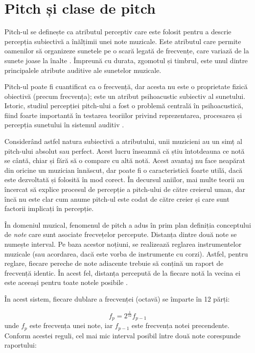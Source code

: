 \documentclass[a4paper,12pt]{report}
\begin{document}
\section{Pitch și clase de pitch}

Pitch-ul se definește ca atributul perceptiv care este folosit  
pentru a descrie percepția subiectivă a înălțimii unei note muzicale. 
Este atributul care permite oamenilor să organizeze sunetele pe o scară 
legată de frecvențe, care variază de la sunete joase la înalte \cite{Bonvini-Recognition}.
Împreună cu durata, zgomotul și timbrul, este unul dintre principalele 
atribute auditive ale sunetelor muzicale.

Pitch-ul poate fi cuantificat ca o frecvență, dar acesta nu este o 
proprietate fizică obiectivă (precum frecvența); este un atribut 
psihoacustic subiectiv al sunetului. Istoric, studiul percepției 
pitch-ului a fost o problemă centrală în psihoacustică, fiind 
foarte importantă în testarea teoriilor privind reprezentarea,  
procesarea și percepția sunetului în sistemul auditiv \cite{Signals-Sound-and-Sensation}.

Considerând astfel natura subiectivă a atributului, unii muzicieni au 
un simț al pitch-ului absolut sau perfect. Acest lucru înseamnă că 
știu întotdeauna ce notă se cântă, chiar și fără să o compare 
cu altă notă. Acest avantaj nu face neapărat din oricine un muzician 
înnăscut, dar poate fi o caracteristică foarte utilă, dacă este dezvoltată și 
folosită în mod corect.
În decursul aniilor, mai multe teorii au încercat să explice 
procesul de percepție a pitch-ului de către creierul uman, dar încă 
nu este clar cum anume pitch-ul este codat de către creier și care sunt 
factorii implicați în percepție.

În domeniul muzical, fenomenul de pitch a adus în prim plan definiția 
conceptului de \emph{note} care sunt asociate frecvețelor percepute.
Distanța dintre două note se numește interval. Pe baza 
acestor noțiuni, se realizează reglarea instrumentelor 
muzicale (sau acordarea, dacă este vorba de instrumente cu corzi).
Astfel, pentru reglare, fiecare pereche de note adiacente trebuie 
să conțină un raport de frecvență identic. În acest fel, distanța 
percepută de la fiecare notă la vecina ei este aceeași pentru toate 
notele posibile \cite{Bonvini-Recognition}. \newpage

În acest sistem, fiecare dublare a frecvenței (octavă) se împarte în
12 părți:

\begin{equation*}
    f_p = 2^{\frac{1}{12}}f_{p-1}
\end{equation*}
unde $f_p$ este frecvența unei note, iar $f_{p-1}$ este frecvența notei 
precendente. Conform acestei reguli, cel mai mic interval posibil 
între două note corespunde raportului:
\end{document}
